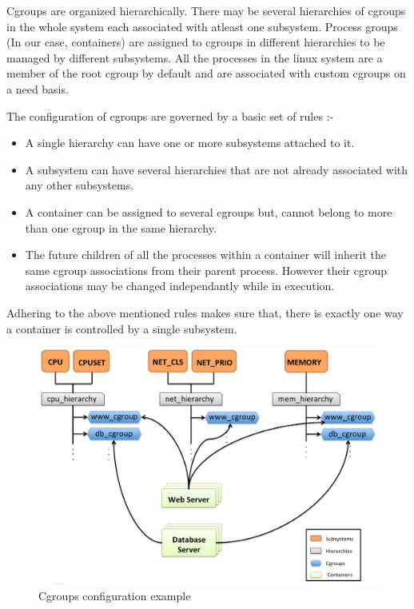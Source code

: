 Cgroups are organized hierarchically. There may be several hierarchies of cgroups in the whole system each associated with atleast one subsystem. Process groups (In our case, containers) are assigned to cgroups in different hierarchies to be managed by different subsystems. All the processes in the linux system are a member of the root cgroup by default and are associated with custom cgroups on a need basis.

The configuration of cgroups are governed by a basic set of rules :-

\begin{itemize}


\item A single hierarchy can have one or more subsystems attached to it.

\item A subsystem can have several hierarchies that are not already associated with any other subsystems.

\item A container can be assigned to several cgroups but, cannot belong to more than one cgroup in the same hierarchy.

\item The future children of all the processes within a container will inherit the same cgroup associations from their parent process. However their cgroup associations may be changed independantly while in execution.

\end{itemize}


Adhering to the above mentioned rules makes sure that, there is exactly one way a container is controlled by a single subsystem. 


\begin{figure}[htbp]
\centering
\includegraphics[width=\textwidth]{cgroup_example.png}
\caption{Cgroups configuration example}
\label{img_cgroup_example}
\end{figure}



